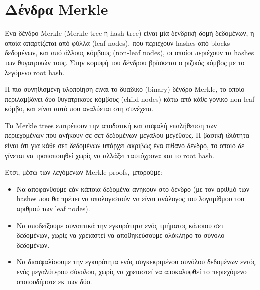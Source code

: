 \section{Δένδρα Merkle} \label{section:2-3-merkle-trees}

Ένα δένδρο Merkle (Merkle tree ή hash tree) είναι μία δενδρική δομή δεδομένων, η οποία απαρτίζεται από φύλλα (leaf nodes), που περιέχουν hashes από blocks δεδομένων, και από άλλους κόμβους (non-leaf nodes), οι οποίοι περιέχουν τα hashes των θυγατρικών τους. Στην κορυφή του δένδρου βρίσκεται ο ριζικός κόμβος με το λεγόμενο root hash\cite{2.3-merkle-tree}.

Η πιο συνηθισμένη υλοποίηση είναι το δυαδικό (binary) δένδρο Merkle, το οποίο περιλαμβάνει δύο θυγατρικούς κόμβους (child nodes) κάτω από κάθε γονικό non-leaf κόμβο, και είναι αυτό που αναλύεται στη συνέχεια.


Τα Merkle trees επιτρέπουν την αποδοτική και ασφαλή επαλήθευση των περιεχομένων που ανήκουν σε σετ δεδομένων μεγάλου μεγέθους. Η βασική ιδιότητα είναι ότι για κάθε σετ δεδομένων υπάρχει ακριβώς ένα πιθανό δένδρο, το οποίο δε γίνεται να τροποποιηθεί χωρίς να αλλάξει ταυτόχρονα και το root hash. 

Έτσι, μέσω των λεγόμενων Merkle proofs, μπορούμε:
\begin{itemize}
	\item Να αποφανθούμε εάν κάποια δεδομένα ανήκουν στο δένδρο (με τον αριθμό των hashes που θα πρέπει να υπολογιστούν να είναι ανάλογος του λογαρίθμου του αριθμού των leaf nodes).
	\item Να αποδείξουμε συνοπτικά την εγκυρότητα ενός τμήματος κάποιου σετ δεδομένων, χωρίς να χρειαστεί να αποθηκεύσουμε ολόκληρο το σύνολο δεδομένων.
	\item Να διασφαλίσουμε την εγκυρότητα ενός συγκεκριμένου συνόλου δεδομένων εντός ενός μεγαλύτερου σύνολου, χωρίς να χρειαστεί να αποκαλυφθεί το περιεχόμενο οποιουδήποτε εκ των δύο\cite{2.3-merkle-proofs-explained}. 
\end{itemize}
